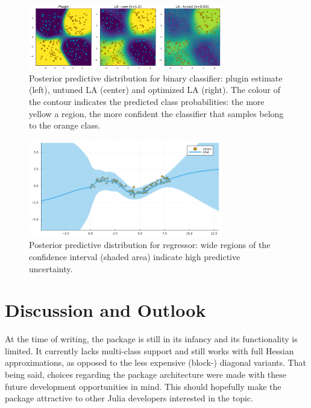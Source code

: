 \documentclass{juliacon}
\begin{document}
\begin{figure}

{\centering \includegraphics[width=3.33333in,height=1.11667in]{www/posterior_predictive_mlp.png}

}

\caption{\label{fig-class}Posterior predictive distribution for binary
classifier: plugin estimate (left), untuned LA (center) and optimized LA
(right). The colour of the contour indicates the predicted class
probabilities: the more yellow a region, the more confident the
classifier that samples belong to the orange class.}

\end{figure}

\begin{figure}

{\centering \includegraphics[width=3.33333in,height=1.66667in]{www/regression.png}

}

\caption{\label{fig-reg}Posterior predictive distribution for regressor:
wide regions of the confidence interval (shaded area) indicate high
predictive uncertainty.}

\end{figure}

\hypertarget{sec-con}{%
\section{Discussion and Outlook}\label{sec-con}}

At the time of writing, the package is still in its infancy and its
functionality is limited. It currently lacks multi-class support and
still works with full Hessian approximations, as opposed to the less
expensive (block-) diagonal variants. That being said, choices regarding
the package architecture were made with these future development
opportunities in mind. This should hopefully make the package attractive
to other Julia developers interested in the topic.
\end{document}
